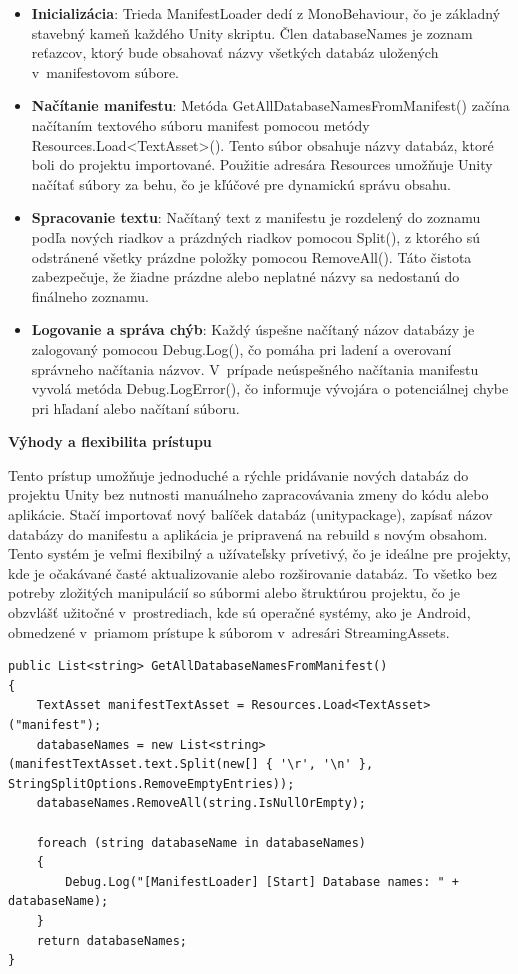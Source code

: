 \begin{itemize}
    \item {\small\textbf{Inicializácia}}: Trieda ManifestLoader dedí z MonoBehaviour, čo je základný stavebný kameň každého Unity skriptu. Člen databaseNames je zoznam reťazcov, ktorý bude obsahovať názvy všetkých databáz uložených v~manifestovom súbore.
    \item {\small\textbf{Načítanie manifestu}}: Metóda GetAllDatabaseNamesFromManifest() začína načítaním textového súboru manifest pomocou metódy Resources.Load<TextAsset>(). Tento súbor obsahuje názvy databáz, ktoré boli do projektu importované. Použitie adresára Resources umožňuje Unity načítať súbory za behu, čo je kľúčové pre dynamickú správu obsahu.
    \item {\small\textbf{Spracovanie textu}}: Načítaný text z manifestu je rozdelený do zoznamu podľa nových riadkov a prázdných riadkov pomocou Split(), z ktorého sú odstránené všetky prázdne položky pomocou RemoveAll(). Táto čistota zabezpečuje, že žiadne prázdne alebo neplatné názvy sa nedostanú do finálneho zoznamu.
    \item {\small\textbf{Logovanie a správa chýb}}: Každý úspešne načítaný názov databázy je zalogovaný pomocou Debug.Log(), čo pomáha pri ladení a overovaní správneho načítania názvov. V~prípade neúspešného načítania manifestu vyvolá metóda Debug.LogError(), čo informuje vývojára o potenciálnej chybe pri hľadaní alebo načítaní súboru.
\end{itemize}

{\normalsize\textbf{Výhody a flexibilita prístupu}}

Tento prístup umožňuje jednoduché a rýchle pridávanie nových databáz do projektu Unity bez nutnosti manuálneho zapracovávania zmeny do kódu alebo aplikácie. Stačí importovať nový balíček databáz (unitypackage), zapísať názov databázy do manifestu a aplikácia je pripravená na rebuild s novým obsahom. Tento systém je veľmi flexibilný a užívateľsky prívetivý, čo je ideálne pre projekty, kde je očakávané časté aktualizovanie alebo rozširovanie databáz. To všetko bez potreby zložitých manipulácií so súbormi alebo štruktúrou projektu, čo je obzvlášť užitočné v~prostrediach, kde sú operačné systémy, ako je Android, obmedzené v~priamom prístupe k súborom v~adresári StreamingAssets.

\lstset{style=Csharp}
\begin{lstlisting}[caption={ManifestLoader Class - Čítanie databáz zo súboru Manifest}, label=manifestLoader]
public List<string> GetAllDatabaseNamesFromManifest()
{
    TextAsset manifestTextAsset = Resources.Load<TextAsset>("manifest");
    databaseNames = new List<string>(manifestTextAsset.text.Split(new[] { '\r', '\n' }, StringSplitOptions.RemoveEmptyEntries));
    databaseNames.RemoveAll(string.IsNullOrEmpty);

    foreach (string databaseName in databaseNames)
    {
        Debug.Log("[ManifestLoader] [Start] Database names: " + databaseName);
    }
    return databaseNames;
}
\end{lstlisting} 


